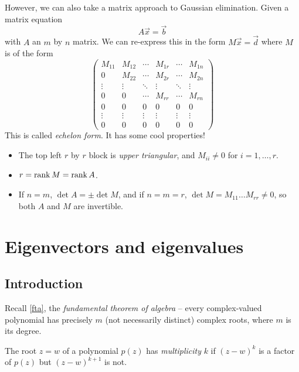 \documentclass{../template/note}
\begin{document}
    However, we can also take a matrix approach to Gaussian elimination. Given a matrix equation
    \[
        A \vec x = \vec b
    \]
    with \(A\) an \(m\) by \(n\) matrix. We can re-express this in the form \(M \vec x = \vec d\) where \(M\) is of the form
    \[
        \begin{pmatrix}
         M_{11} & M_{12} & \cdots & M_{1r} & \cdots & M_{1n} \\
         0 & M_{22} & \cdots & M_{2r} & \cdots & M_{2n} \\
         \vdots & \vdots & \ddots & \vdots & \ddots & \vdots \\
         0 & 0 & \cdots & M_{rr} & \cdots & M_{rn} \\
         0 & 0 & 0 & 0 & 0 & 0 \\
         \vdots & \vdots & \vdots & \vdots & \vdots & \vdots \\
         0 & 0 & 0 & 0 & 0 & 0
        \end{pmatrix}
    \]
    This is called \emph{echelon form}. It has some cool properties!
    \begin{itemize}
        \item The top left \(r\) by \(r\) block is \emph{upper triangular}, and \(M_{ii} \neq 0\) for \(i = 1, \dots, r\).
        \item \(r = \operatorname{rank} M = \operatorname{rank} A\).
        \item If \(n = m\), \(\det A = \pm \det M\), and if \(n=m=r\), \(\det M = M_{11}\dots M_{rr} \neq 0\), so both \(A\) and \(M\) are invertible.
    \end{itemize}
    
    \section{Eigenvectors and eigenvalues}

    \subsection{Introduction}

    Recall \cref{fta}, the \emph{fundamental theorem of algebra} -- every complex-valued polynomial has precisely \(m\) (not necessarily distinct) complex roots, where \(m\) is its degree.
    
    \begin{definition}
        The root \(z = w\) of a polynomial \(p(z)\) has \emph{multiplicity} \(k\) if \((z-w)^k\) is a factor of \(p(z)\) but \((z-w)^{k+1}\) is not.
    \end{definition}
    
\end{document}
